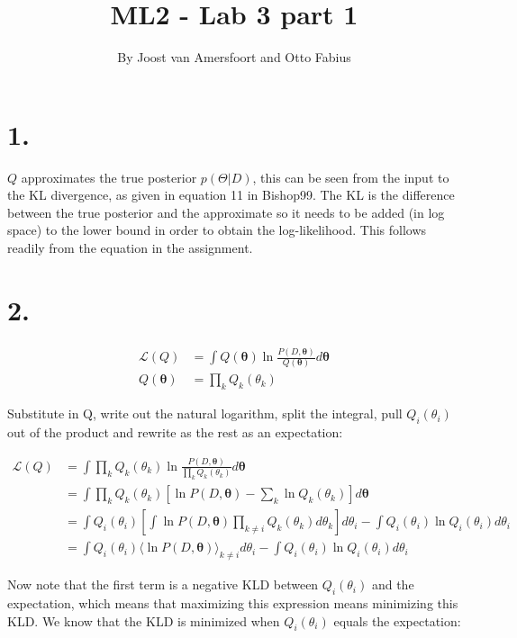 \documentclass{article}
\def\*#1{\boldsymbol{#1}}
\begin{document}
\title{ML2 - Lab 3 part 1}
\author{By Joost van Amersfoort and Otto Fabius}
\maketitle

\section*{1.}

$Q$ approximates the true posterior $p(\Theta|D)$, this can be seen from the input to the KL divergence, as given in equation 11 in Bishop99. The KL is the difference between the true posterior and the approximate so it needs to be added (in log space) to the lower bound in order to obtain the log-likelihood. This follows readily from the equation in the assignment.

\section*{2.}

\begin{align*}
\mathcal{L}(Q) &= \int Q(\*\theta) \ln \frac{P(D, \*\theta)}{Q(\*\theta)}d\*\theta \\
Q(\*\theta) &= \prod_k Q_k(\theta_k)
\end{align*}

Substitute in Q, write out the natural logarithm, split the integral, pull $Q_i(\theta_i)$ out of the product and rewrite as the rest as an expectation:

\begin{align*}
\mathcal{L}(Q) &= \int \prod_k Q_k(\theta_k) \ln \frac{P(D, \*\theta)}{\prod_k Q_k(\theta_k)}d\*\theta \\
&= \int \prod_k Q_k(\theta_k) \left [ \ln P(D, \*\theta) - \sum_k \ln Q_k(\theta_k) \right ] d\*\theta \\
&= \int Q_i(\theta_i) \left [ \int \ln P(D, \*\theta) \prod_{k \neq i} Q_k(\theta_k) d\theta_k \right ] d\theta_i - \int Q_i(\theta_i) \ln Q_i(\theta_i) d\theta_i \\
&= \int Q_i(\theta_i) \langle \ln P(D, \*\theta) \rangle_{k \neq i} d\theta_i - \int Q_i(\theta_i) \ln Q_i(\theta_i) d\theta_i
\end{align*}

Now note that the first term is a negative KLD between $Q_i(\theta_i)$ and the expectation, which means that maximizing this expression means minimizing this KLD. We know that the KLD is minimized when $Q_i(\theta_i)$ equals the expectation:
\end{document}
